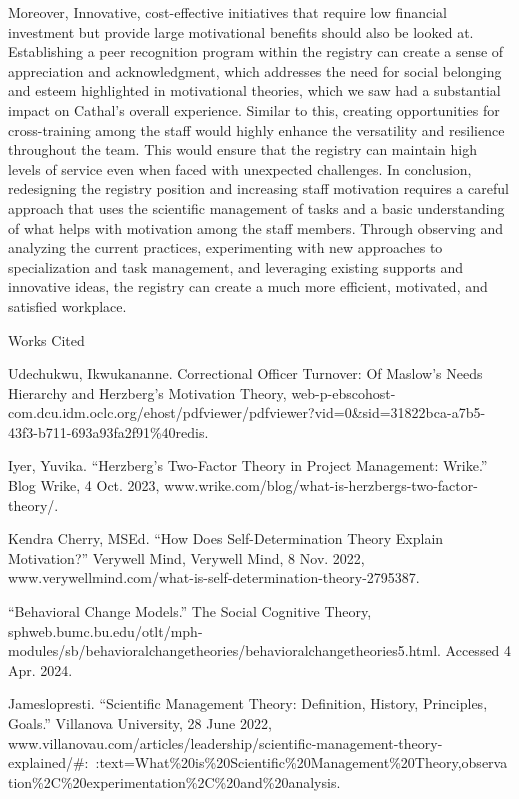\documentclass[12pt]{article}
\newcommand{\bibent}{\noindent \hangindent 40pt}
\newenvironment{workscited}{\newpage \begin{center} Works Cited \end{center}}{\newpage }
\begin{document}
\begin{flushleft}
\bigbreak \noindent 
\hspace{\parindent} Moreover, Innovative, cost-effective initiatives that require low financial investment but provide large motivational benefits should also be looked at. Establishing a peer recognition program within the registry can create a sense of appreciation and acknowledgment, which addresses the need for social belonging and esteem highlighted in motivational theories, which we saw had a substantial impact on Cathal's overall experience. Similar to this, creating opportunities for cross-training among the staff would highly enhance the versatility and resilience throughout the team. This would ensure that the registry can maintain high levels of service even when faced with unexpected challenges.
\bigbreak \noindent 
\hspace{\parindent} In conclusion, redesigning the registry position and increasing staff motivation requires a careful approach that uses the scientific management of tasks and a basic understanding of what helps with motivation among the staff members. Through observing and analyzing the current practices, experimenting with new approaches to specialization and task management, and leveraging existing supports and innovative ideas, the registry can create a much more efficient, motivated, and satisfied workplace. 






\begin{workscited}

\bibent 
Udechukwu, Ikwukananne. Correctional Officer Turnover: Of Maslow’s Needs Hierarchy and Herzberg’s Motivation Theory, web-p-ebscohost-com.dcu.idm.oclc.org/ehost/pdfviewer/pdfviewer?vid=0&sid=31822bca-a7b5-43f3-b711-693a93fa2f91\%40redis. 

\bibent
Iyer, Yuvika. “Herzberg’s Two-Factor Theory in Project Management: Wrike.” Blog Wrike, 4 Oct. 2023, www.wrike.com/blog/what-is-herzbergs-two-factor-theory/.

\bibent 
Kendra Cherry, MSEd. “How Does Self-Determination Theory Explain Motivation?” Verywell Mind, Verywell Mind, 8 Nov. 2022, www.verywellmind.com/what-is-self-determination-theory-2795387. 

\bibent
“Behavioral Change Models.” The Social Cognitive Theory, sphweb.bumc.bu.edu/otlt/mph-modules/sb/behavioralchangetheories/behavioralchangetheories5.html. Accessed 4 Apr. 2024. 

\bibent
Jameslopresti. “Scientific Management Theory: Definition, History, Principles, Goals.” Villanova University, 28 June 2022, www.villanovau.com/articles/leadership/scientific-management-theory-explained/#:~:text=What\%20is\%20Scientific\%20Management\%20Theory,observation\%2C\%20experimentation\%2C\%20and\%20analysis.
\end{workscited}

\end{flushleft}
\end{document}
